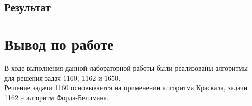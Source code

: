 \documentclass[a5paper, 10pt]{article}
\theoremstyle{definition}
\theoremstyle{plain}
\theoremstyle{remark}
\begin{document}
\subsection{Результат}


\newpage
\section{Вывод по работе}
В ходе выполнения данной лабораторной работы были реализованы алгоритмы для решения задач $1160$, $1162$ и $1650$. \\

Решение задачи 1160 основывается на применении алгоритма Краскала, задачи 1162 -- алгоритм Форда-Беллмана. 
\end{document}
